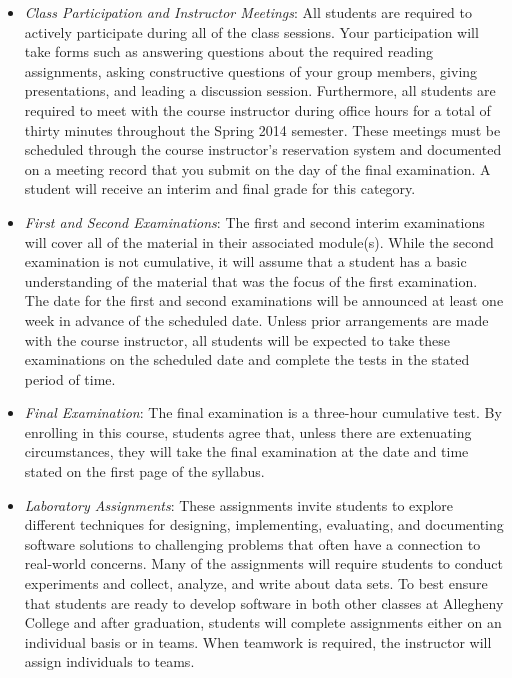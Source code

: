\begin{itemize}

	\item {\em Class Participation and Instructor Meetings}: All students are required to actively participate
	  during all of the class sessions. Your participation will take forms such as answering questions about the
	  required reading assignments, asking constructive questions of your group members, giving presentations, and
	  leading a discussion session. Furthermore, all students are required to meet with the course instructor during
	  office hours for a total of thirty minutes throughout the Spring 2014 semester.  These meetings must be scheduled
	  through the course instructor's reservation system and documented on a meeting record that you submit on the
	  day of the final examination. A student will receive an interim and final grade for this category.

	\item {\em First and Second Examinations}: The first and second interim examinations will cover all of the material
	  in their associated module(s).  While the second examination is not cumulative, it will assume that a student has a
	  basic understanding of the material that was the focus of the first examination.  The date for the first and
	  second examinations will be announced at least one week in advance of the scheduled date.  Unless prior
	  arrangements are made with the course instructor, all students will be expected to take these examinations on the
	  scheduled date and complete the tests in the stated period of time.

	\item {\em Final Examination}: The final examination is a three-hour cumulative test.  By enrolling in this
	  course, students agree that, unless there are extenuating circumstances, they will take the final examination
	  at the date and time stated on the first page of the syllabus.

	\item {\em Laboratory Assignments}: These assignments invite students to explore different techniques for
	  designing, implementing, evaluating, and documenting software solutions to challenging problems that often
	  have a connection to real-world concerns.  Many of the assignments will require students to conduct
	  experiments and collect, analyze, and write about data sets.  To best ensure that students are ready to
	  develop software in both other classes at Allegheny College and after graduation, students will complete
	  assignments either on an individual basis or in teams.  When teamwork is required, the instructor will assign
	  individuals to teams.
	

\end{itemize}
